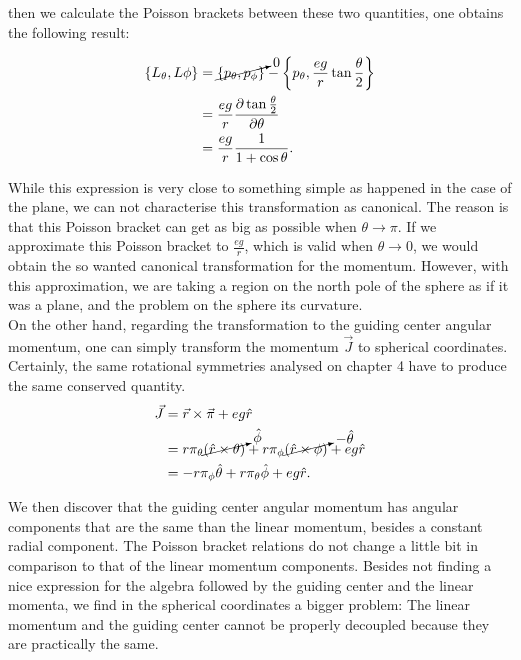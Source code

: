 then we calculate the Poisson brackets between these two quantities, one obtains the following result:

\begin{align*}
\left\lbrace L_\theta, L\phi \right\rbrace &= \cancelto{0}{\left\lbrace p_\theta, p_\phi \right\rbrace}-\left\lbrace p_\theta, \frac{eg}{r}\tan{\frac{\theta}{2}} \right\rbrace\\
&= \frac{eg}{r}\frac{\partial \tan{\frac{\theta}{2}} }{\partial \theta}\\
&=  \frac{eg}{r} \frac{1}{1+\cos{\theta}}.
\end{align*}

While this expression is very close to something simple as happened in the case of the plane, we can not characterise this transformation as canonical. The reason is that this Poisson bracket can get as big as possible when $\theta \to \pi$. If we approximate this Poisson bracket to $\frac{eg}{r}$, which is valid when $\theta \to 0$, we would obtain the so wanted canonical transformation for the momentum. However, with this approximation, we are taking a region on the north pole of the sphere as if it was a plane, and the problem on the sphere its curvature.\\

On the other hand, regarding the transformation to the guiding center angular momentum, one can simply transform the momentum $\vec{J}$ to spherical coordinates. Certainly, the same rotational symmetries analysed on chapter 4 have to produce the same conserved quantity.\\

\begin{align*}
\vec{J} &= \vec{r}\times\vec{\pi} + eg\hat{r}\\
&= r\pi_\theta \cancelto{\hat{\phi}}{(\hat{r}\times \theta)} + r\pi_\phi \cancelto{-\hat{\theta}}{(\hat{r}\times \phi)} + eg\hat{r}\\
&= -r\pi_\phi \hat{\theta} + r\pi_\theta \hat{\phi} + eg\hat{r}.
\end{align*}

We then discover that the guiding center angular momentum has angular components that are the same than the linear momentum, besides a constant radial component. The Poisson bracket relations do not change a little bit in comparison to that of the linear momentum components. Besides not finding a nice expression for the algebra followed by the guiding center and the linear momenta, we find in the spherical coordinates a bigger problem: The linear momentum and the guiding center cannot be properly decoupled because they are practically the same.\\

